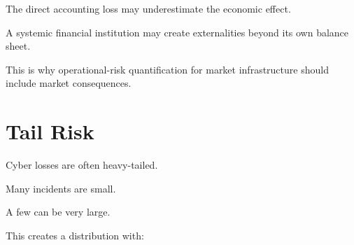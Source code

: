 The direct accounting loss may underestimate the economic effect.

A systemic financial institution may create externalities beyond its own balance sheet.

This is why operational-risk quantification for market infrastructure should include market consequences.

\section{Tail Risk}

Cyber losses are often heavy-tailed.

Many incidents are small.

A few can be very large.

This creates a distribution with:

